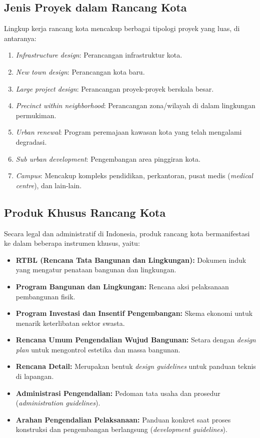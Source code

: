 \documentclass[../rumukota.tex]{subfiles}
\begin{document}
\subsection{Jenis Proyek dalam Rancang Kota}
Lingkup kerja rancang kota mencakup berbagai tipologi proyek yang luas, di antaranya:
\begin{enumerate}
	\item \textit{Infrastructure design}: Perancangan infrastruktur kota.
	\item \textit{New town design}: Perancangan kota baru.
	\item \textit{Large project design}: Perancangan proyek-proyek berskala besar.
	\item \textit{Precinct within neighborhood}: Perancangan zona/wilayah di dalam lingkungan permukiman.
	\item \textit{Urban renewal}: Program peremajaan kawasan kota yang telah mengalami degradasi.
	\item \textit{Sub urban development}: Pengembangan area pinggiran kota.
	\item \textit{Campus}: Mencakup kompleks pendidikan, perkantoran, pusat medis (\textit{medical centre}), dan lain-lain.
\end{enumerate}

\subsection{Produk Khusus Rancang Kota}
Secara legal dan administratif di Indonesia, produk rancang kota bermanifestasi ke dalam beberapa instrumen khusus, yaitu:
\begin{itemize}
	\item \textbf{RTBL (Rencana Tata Bangunan dan Lingkungan):} Dokumen induk yang mengatur penataan bangunan dan lingkungan.
	\item \textbf{Program Bangunan dan Lingkungan:} Rencana aksi pelaksanaan pembangunan fisik.
	\item \textbf{Program Investasi dan Insentif Pengembangan:} Skema ekonomi untuk menarik keterlibatan sektor swasta.
	\item \textbf{Rencana Umum Pengendalian Wujud Bangunan:} Setara dengan \textit{design plan} untuk mengontrol estetika dan massa bangunan.
	\item \textbf{Rencana Detail:} Merupakan bentuk \textit{design guidelines} untuk panduan teknis di lapangan.
	\item \textbf{Administrasi Pengendalian:} Pedoman tata usaha dan prosedur (\textit{administration guidelines}).
	\item \textbf{Arahan Pengendalian Pelaksanaan:} Panduan konkret saat proses konstruksi dan pengembangan berlangsung (\textit{development guidelines}).
\end{itemize}
\end{document}
